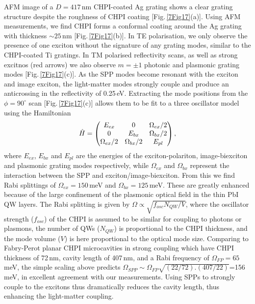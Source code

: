 AFM image of a $D=417$\,nm CHPI-coated Ag grating shows a clear grating structure despite the roughness of CHPI coating [Fig.\,\ref{7Fig17}(a)]. Using AFM measurements, we find CHPI forms a conformal coating around the Ag grating with thickness $\sim25$\,nm [Fig.\,\ref{7Fig17}(b)]. In TE polarisation, we only observe the presence of one exciton without the signature of any grating modes, similar to the CHPI-coated Ti gratings. In TM polarised reflectivity scans, as well as strong excitnos (red arrows) we also observe $m=\pm1$ photonic and plasmonic grating modes [Fig.\,\ref{7Fig17}(c)].  As the SPP modes become resonant with the exciton and image exciton, the light-matter modes strongly couple and produce an anticrossing in the reflectivity of 0.25\,eV. Extracting the mode positions from the $\phi=90^{\circ}$ scan [Fig.\,\ref{7Fig17}(c)] allows them to be fit to a three oscillator model using the Hamiltonian
\begin{equation}
\centering 
\hat{H}=\left( \begin{matrix} 
E_{ex} & 0 & \Omega_{ex}/2 \\
0 & E_{bx} & \Omega_{bx}/2 \\
\Omega_{ex}/2 & \Omega_{bx}/2 & E_{pl} 
\end{matrix} \right) ,
\end{equation}
where $E_{ex}$, $E_{bx}$ and $E_{pl}$ are the energies of the exciton-polariton, image-biexciton and plasmonic grating modes respectively, while $\Omega_{ex}$ and $\Omega_{bx}$ represent the interaction between the SPP and exciton/image-biexciton. From this we find Rabi splittings of $\Omega_{ex}=150$\,meV and $\Omega_{bx}=125$\,meV. 
These are greatly enhanced because of the large confinement of the plasmonic optical field in the thin PbI QW layers. The Rabi splitting is given by $\Omega \propto \sqrt{f_{osc} N_{QW}/V}$, where the oscillator strength ($f_{osc}$) of the CHPI is assumed to be similar for coupling to photons or plasmons, the number of QWs ($N_{QW}$) is proportional to the CHPI thickness, and the mode volume ($V$) is here proportional to the optical mode size. Comparing to Fabry-Perot planar CHPI microcavities in strong coupling \cite{Pradeesh2009b} which have CHPI thickness of 72\,nm, cavity length of 407\,nm, and a Rabi frequency of $\Omega_{FP}=65$\,meV, the simple scaling above predicts $\Omega_{SPP} \sim \Omega_{FP} \sqrt{(22/72).(407/22)}$=156\,meV, in excellent agreement with our measurements. Using SPPs to strongly couple to the excitons thus dramatically reduces the cavity length, thus enhancing the light-matter coupling.


